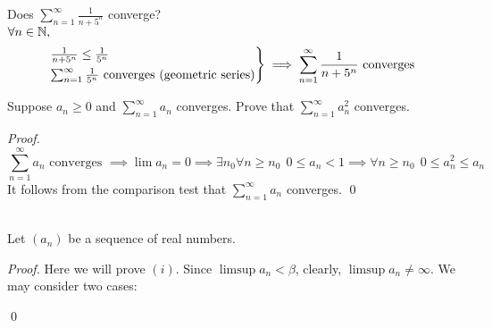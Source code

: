 \begin{example} \leavevmode
    Does $\sum_{n=1}^{\infty}\frac{1}{n+5^n}$ converge?\\
    $\forall n\in \mathbb{N},$
    $$\begin{rcases*}
        \frac{1}{n+5^n} \leq \frac{1}{5^n} \\
        \sum_{n=1}^{\infty} \frac{1}{5^n} \text{ converges (geometric series)}
    \end{rcases*}
    \implies \sum_{n=1}^{\infty} \frac{1}{n+5^n} \text{ converges}$$
\end{example}

\begin{example}
    Suppose $a_n \geq 0$ and $\sum_{n=1}^{\infty}a_n$ converges. Prove that $\sum_{n=1}^{\infty}a_n ^2$ converges.
\end{example}
\begin{proof}
    $$\sum_{n=1}^{\infty}a_n \text{ converges } \implies \lim a_n = 0 \implies \exists n_0 \forall n \geq n_0 ~~ 0 \leq a_n < 1 \implies \forall n \geq n_0 ~~ 0 \leq a_n ^2 \leq a_n$$
    It follows from the comparison test that $\sum_{n=1}^{\infty}a_n$ converges. \qed
\end{proof}

\begin{theorem} \leavevmode \\
    \label{thm3.17}
    Let $(a_n)$ be a sequence of real numbers.
\end{theorem}
\begin{proof}
    Here we will prove $(i)$.
    Since $\limsup a_n < \beta$, clearly, $\limsup a_n \not = \infty.$ We may consider two cases:
    \qed
\end{proof}

